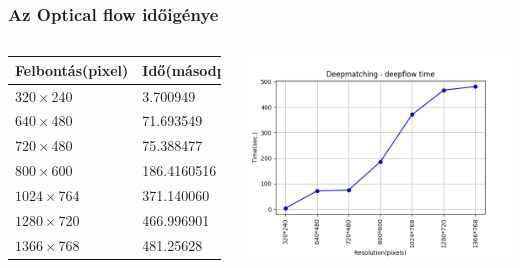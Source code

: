 \documentclass{beamer}
\begin{document}
	\begin{frame}
		\frametitle{Az Optical flow időigénye}
		\begin{center}
			\begin{columns}
				\begin{tabular}{ | l | l |}
					\hline
					Felbontás(pixel) & Idő(másodperc) \\ \hline
					$320 \times $240 & 3.700949 \\ \hline
					$640 \times $480 & 71.693549 \\ \hline
					$720 \times $480 & 75.388477 \\ \hline
					$800 \times $600 & 186.4160516 \\ \hline
					$1024 \times $764 & 371.140060 \\ \hline
					$1280 \times $720 & 466.996901 \\ \hline
					$1366 \times $768 & 481.25628 \\ \hline
				\end{tabular}
				\includegraphics[scale=0.42]{deepmatching_deeplfow.png}
			\end{columns}
		\end{center}
	\end{frame}
\end{document}
